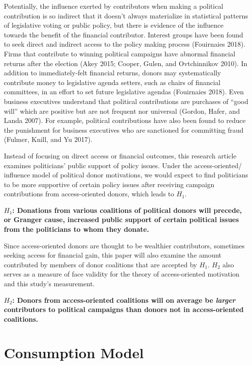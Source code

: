 \documentclass[12pt,]{article}
\begin{document}
Potentially, the influence exerted by contributors when making a
political contribution is so indirect that it doesn't always materialize
in statistical patterns of legislative voting or public policy, but
there is evidence of the influence towards the benefit of the financial
contributor. Interest groups have been found to seek direct and indirect
access to the policy making process (Fouirnaies 2018). Firms that
contribute to winning political campaigns have abnormal financial
returns after the election (Akey 2015; Cooper, Gulen, and Ovtchinnikov
2010). In addition to immediately-felt financial returns, donors may
systematically contribute money to legislative agenda setters, such as
chairs of financial committees, in an effort to set future legislative
agendas (Fouirnaies 2018). Even business executives understand that
political contributions are purchases of ``good will'' which are
positive but are not frequent nor universal (Gordon, Hafer, and Landa
2007). For example, political contributions have also been found to
reduce the punishment for business executives who are sanctioned for
committing fraud (Fulmer, Knill, and Yu 2017).

Instead of focusing on direct access or financial outcomes, this
research article examines politicians' public support of policy issues.
Under the access-oriented/ influence model of political donor
motivations, we would expect to find politicians to be more supportive
of certain policy issues after receiving campaign contributions from
access-oriented donors, which leads to \(H_{1}\).

\textbf{\(H_{1}\): Donations from various coalitions of political donors
will precede, or Granger cause, increased public support of certain
political issues from the politicians to whom they donate.}

Since access-oriented donors are thought to be wealthier contributors,
sometimes seeking access for financial gain, this paper will also
examine the amount contributed by members of donor coalitions that are
accepted by \(H_{1}\). \(H_{2}\) also serves as a measure of face
validity for the theory of access-oriented motivation and this study's
measurement.

\textbf{\(H_{2}\): Donors from access-oriented coalitions will on
average be \emph{larger} contributors to political campaigns than donors
not in access-oriented coalitions.}

\hypertarget{consumption-model}{%
\section{Consumption Model}\label{consumption-model}}
\end{document}
